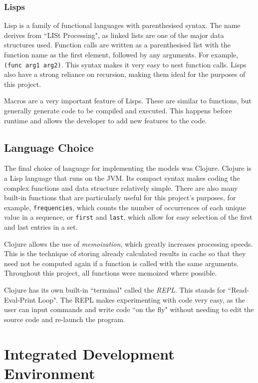 \subsubsection{Lisps}

Lisp is a family of functional languages with parenthesised syntax. The name derives from ``LISt Processing", as linked lists are one of the major data structures used. Function calls are written as a parenthesised list with the function name as the first element, followed by any arguments. For example, \lstinline!(func arg1 arg2)!. This syntax makes it very easy to nest function calls. Lisps also have a strong reliance on recursion, making them ideal for the purposes of this project. 

Macros are a very important feature of Lisps. These are similar to functions, but generally generate code to be compiled and executed. This happens before runtime and allows the developer to add new features to the code.



\subsection{Language Choice}

The final choice of language for implementing the models was Clojure. Clojure is a Lisp language that runs on the JVM. Its compact syntax makes coding the complex functions and data structure relatively simple. There are also many  built-in functions that are particularly useful for this project's purposes, for example, \lstinline!frequencies!, which counts the number of occurrences of each unique value in a sequence, or \lstinline!first! and \lstinline!last!, which allow for easy selection of the first and last entries in a set.

Clojure allows the use of \textit{memoization}, which greatly increases processing speeds. This is the technique of storing already calculated results in cache so that they need not be computed again if a function is called with the same arguments. Throughout this project, all functions were memoized where possible.

Clojure has its own built-in ``terminal" called the \textit{REPL}. This stands for ``Read-Eval-Print Loop". The REPL makes experimenting with code very easy, as the user can input commands and write code ``on the fly" without needing to edit the source code and re-launch the program.



\section{Integrated Development Environment}

